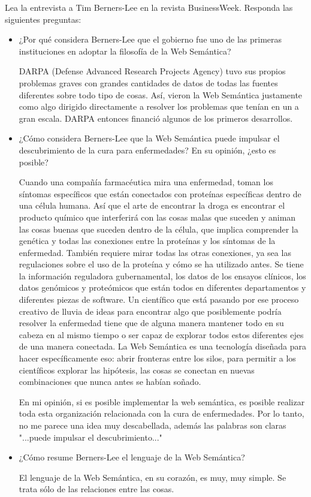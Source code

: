 \documentclass[a4paper,12pt,oneside,final,spanish]{article}
\begin{document}
Lea la entrevista a Tim Berners-Lee en la revista BusinessWeek. Responda las siguientes preguntas:
\begin{itemize}
\item ¿Por qué considera Berners-Lee que el gobierno fue uno de las primeras instituciones en adoptar la filosofía de la Web Semántica?

DARPA (Defense Advanced Research Projects Agency) tuvo sus propios problemas graves con grandes cantidades de datos de todas las fuentes diferentes sobre todo tipo de cosas. Así, vieron la Web Semántica justamente como algo dirigido directamente a resolver los problemas que tenían en un a gran escala. DARPA entonces financió algunos de los primeros desarrollos.

\item ¿Cómo considera Berners-Lee que la Web Semántica puede impulsar el descubrimiento de la cura para enfermedades? En su opinión, ¿esto es posible?

Cuando una compañía farmacéutica mira una enfermedad, toman los síntomas específicos que están conectados con proteínas específicas dentro de una célula humana. Así que el arte de encontrar la droga es encontrar el producto químico que interferirá con las cosas malas que suceden y animan las cosas buenas que suceden dentro de la célula, que implica comprender la genética y todas las conexiones entre la proteínas y los síntomas de la enfermedad. También requiere mirar todas las otras conexiones, ya sea las regulaciones sobre el uso de la proteína y cómo se ha utilizado antes. Se tiene la información reguladora gubernamental, los datos de los ensayos clínicos, los datos genómicos y proteómicos que están todos en diferentes departamentos y diferentes piezas de software. Un científico que está pasando por ese proceso creativo de lluvia de ideas para encontrar algo que posiblemente podría resolver la enfermedad tiene que de alguna manera mantener todo en su cabeza en al mismo tiempo o ser capaz de explorar todos estos diferentes ejes de una manera conectada. La Web Semántica es una tecnología diseñada para hacer específicamente eso: abrir fronteras entre los silos, para permitir a los científicos explorar las hipótesis, las cosas se conectan en nuevas combinaciones que nunca antes se habían soñado.

En mi opinión, si es posible implementar la web semántica, es posible realizar toda esta organización relacionada con la cura de enfermedades. Por lo tanto, no me parece una idea muy descabellada, además las palabras son claras "...puede impulsar el descubrimiento..."

\item ¿Cómo resume Berners-Lee el lenguaje de la Web Semántica?

El lenguaje de la Web Semántica, en su corazón, es muy, muy simple. Se trata sólo de las relaciones entre las cosas.
\end{itemize}
\end{document}
